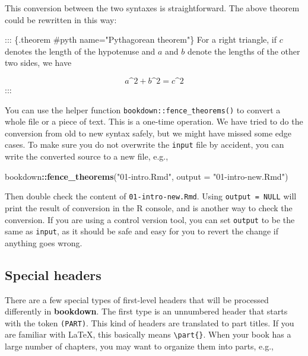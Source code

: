 \documentclass[
  12pt,
]{krantz}
\newenvironment{Shaded}{\begin{snugshade}}{\end{snugshade}}
\newcommand{\AttributeTok}[1]{\textcolor[rgb]{0.13,0.29,0.53}{#1}}
\newcommand{\FunctionTok}[1]{\textcolor[rgb]{0.13,0.29,0.53}{\textbf{#1}}}
\newcommand{\NormalTok}[1]{#1}
\newcommand{\SpecialCharTok}[1]{\textcolor[rgb]{0.81,0.36,0.00}{\textbf{#1}}}
\newcommand{\StringTok}[1]{\textcolor[rgb]{0.31,0.60,0.02}{#1}}
\theoremstyle{definition}
\theoremstyle{definition}
\theoremstyle{definition}
\theoremstyle{definition}
\theoremstyle{remark}
\begin{document}
This conversion between the two syntaxes is straightforward. The above theorem could be rewritten in this way:

\begin{Shaded}
\begin{Highlighting}[]
\NormalTok{::: \{.theorem \#pyth name="Pythagorean theorem"\}}
\NormalTok{For a right triangle, if $c$ denotes the length of the hypotenuse}
\NormalTok{and $a$ and $b$ denote the lengths of the other two sides, we have}

\NormalTok{$$a\^{}2 + b\^{}2 = c\^{}2$$}
\NormalTok{:::}
\end{Highlighting}
\end{Shaded}

You can use the helper function \texttt{bookdown::fence\_theorems()} to convert a whole file or a piece of text. This is a one-time operation. We have tried to do the conversion from old to new syntax safely, but we might have missed some edge cases. To make sure you do not overwrite the \texttt{input} file by accident, you can write the converted source to a new file, e.g.,

\begin{Shaded}
\begin{Highlighting}[]
\NormalTok{bookdown}\SpecialCharTok{::}\FunctionTok{fence\_theorems}\NormalTok{(}\StringTok{"01{-}intro.Rmd"}\NormalTok{, }\AttributeTok{output =} \StringTok{"01{-}intro{-}new.Rmd"}\NormalTok{)}
\end{Highlighting}
\end{Shaded}

Then double check the content of \texttt{01-intro-new.Rmd}. Using \texttt{output\ =\ NULL} will print the result of conversion in the R console, and is another way to check the conversion. If you are using a control version tool, you can set \texttt{output} to be the same as \texttt{input}, as it should be safe and easy for you to revert the change if anything goes wrong.

\subsection{Special headers}\label{special-headers}

There are a few special types of first-level headers that will be processed differently in \textbf{bookdown}. The first type is an unnumbered header that starts with the token \texttt{(PART)}. This kind of headers are translated to part titles. If you are familiar with LaTeX, this basically means \texttt{\textbackslash{}part\{\}}. When your book has a large number of chapters, you may want to organize them into parts, e.g.,
\end{document}
